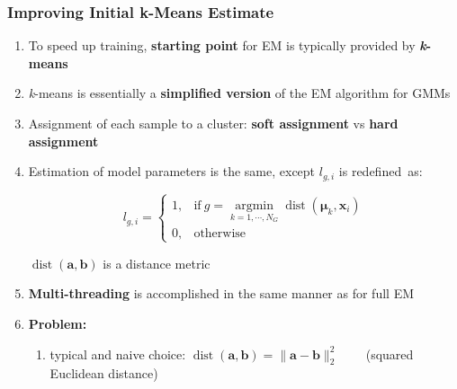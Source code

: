 \documentclass[usenames,dvipsnames]{beamer}
\DeclareMathOperator*{\argmin}{argmin}
\def\Vec#1{{\boldsymbol{#1}}}
\begin{document}
\begin{frame}
\frametitle{Improving Initial k-Means Estimate}

\begin{enumerate}[{~~$\boldsymbol{\bullet}$}]

\item
To speed up training, {\bf starting point} for EM is typically provided by \textbf{\textit{k}-means}
\vspace{0.5ex}

\item
{\it k}-means is essentially a {\bf simplified version} of the EM algorithm for GMMs
\vspace{0.5ex}

\item
Assignment of each sample to a cluster: {\bf soft assignment} vs {\bf hard assignment}
\vspace{0.5ex}

\item
Estimation of model parameters is the same, except $l_{g,i}$ is redefined~as:%

\vspace{-1.5ex}
\begin{minipage}{1\textwidth}
\begin{minipage}{0.5\textwidth}
\begin{equation*}
  l_{g,i} = \left\{
  \begin{array}{ll}
  1, & \mbox{if} ~ g = \argmin\limits_{k=1, \cdots, N_G} \operatorname{dist}(\Vec{\mu}_k, \Vec{x}_i) \\
  0, & \mbox{otherwise}
  \end{array}
  \right.
\end{equation*}%
\end{minipage}
\begin{minipage}{0.5\textwidth}
{$\operatorname{dist}(\Vec{a}, \Vec{b})$} is a distance metric
\end{minipage}
\end{minipage}
\vspace{0.5ex}


\item 
{\bf Multi-threading} is accomplished in the same manner as for full EM
\vspace{0.5ex}

\item
{\bf Problem:}
\begin{enumerate}[{$\boldsymbol{\rightarrow}$}]
\renewcommand{\itemsep}{0.9ex}

\item
typical and naive choice:  $\operatorname{dist}(\Vec{a}, \Vec{b}) = \| \Vec{a} - \Vec{b} \|^{2}_{2}$   ~~~ (squared Euclidean distance)


\end{enumerate}
\end{enumerate}
\end{frame}
\end{document}
